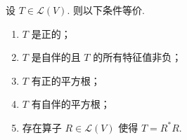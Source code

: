 \begin{theorem}{}{}
    设 $ T \in \mathcal{L}(V) $. 则以下条件等价.
    \begin{enumerate}
        \item \label{item:25:正算子刻画:1}
              $ T $ 是正的；

        \item \label{item:25:正算子刻画:2}
              $ T $ 是自伴的且 $ T $ 的所有特征值非负；

        \item \label{item:25:正算子刻画:3}
              $ T $ 有正的平方根；

        \item \label{item:25:正算子刻画:4}
              $ T $ 有自伴的平方根；

        \item \label{item:25:正算子刻画:5}
              存在算子 $ R \in \mathcal{L}(V) $ 使得 $ T = R^{*}R $.
    \end{enumerate}
\end{theorem}

